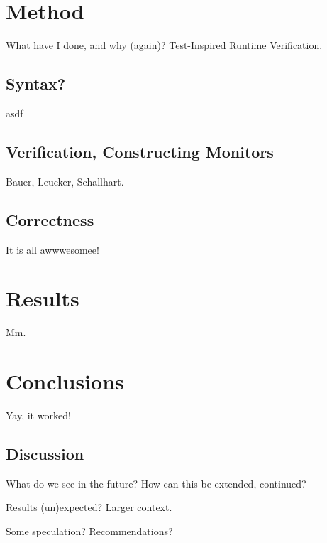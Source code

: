 \documentclass[a4paper,11pt]{kth-mag}
\begin{document}
\pagestyle{newchap}
\chapter{Method}

What have I done, and why (again)? Test-Inspired Runtime Verification.


\section{Syntax?}

asdf

\section{Verification, Constructing Monitors}

Bauer, Leucker, Schallhart.

\section{Correctness}

It is all awwwesomee!





\pagestyle{newchap}
\chapter{Results}

Mm.





\pagestyle{newchap}
\chapter{Conclusions}
Yay, it worked!


\section{Discussion}

What do we see in the future? How can this be extended, continued?

Results (un)expected? Larger context.

Some speculation? Recommendations?
\end{document}
